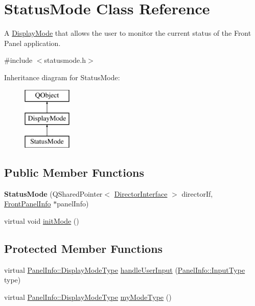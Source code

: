 \hypertarget{class_status_mode}{\section{Status\-Mode Class Reference}
\label{class_status_mode}
}


A \hyperlink{class_display_mode}{Display\-Mode} that allows the user to monitor the current status of the Front Panel application.  




{\ttfamily \#include $<$statusmode.\-h$>$}

Inheritance diagram for Status\-Mode\-:\begin{figure}[H]
\begin{center}
\leavevmode
\includegraphics[height=3.000000cm]{class_status_mode}
\end{center}
\end{figure}
\subsection*{Public Member Functions}
\begin{DoxyCompactItemize}
\item 
\hypertarget{class_status_mode_a32ef3cf6d220b5eb793e4d0d209e8c41}{{\bfseries Status\-Mode} (Q\-Shared\-Pointer$<$ \hyperlink{class_director_interface}{Director\-Interface} $>$ director\-If, \hyperlink{class_front_panel_info}{Front\-Panel\-Info} $\ast$panel\-Info)}\label{class_status_mode_a32ef3cf6d220b5eb793e4d0d209e8c41}

\item 
virtual void \hyperlink{class_status_mode_ae338584a2e978b8a3d2d34d7bf03c6f6}{init\-Mode} ()
\end{DoxyCompactItemize}
\subsection*{Protected Member Functions}
\begin{DoxyCompactItemize}
\item 
virtual \hyperlink{namespace_panel_info_adb8b98e092c15e831aa524d39701d565}{Panel\-Info\-::\-Display\-Mode\-Type} \hyperlink{class_status_mode_aea87d00264d99e1ef0eaf5c41e007f01}{handle\-User\-Input} (\hyperlink{namespace_panel_info_aeeb3b627166cd15c3898f93a1a499c65}{Panel\-Info\-::\-Input\-Type} type)
\item 
virtual \hyperlink{namespace_panel_info_adb8b98e092c15e831aa524d39701d565}{Panel\-Info\-::\-Display\-Mode\-Type} \hyperlink{class_status_mode_aa10144c981b493e0de51cdf5b7ad1d21}{my\-Mode\-Type} ()
\end{DoxyCompactItemize}
